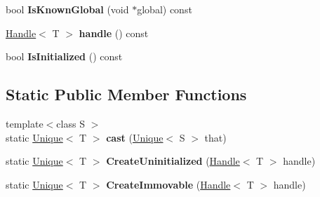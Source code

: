 \begin{DoxyCompactItemize}
\item 
\hypertarget{classv8_1_1internal_1_1_unique_ae68470ebf29b25950c9b5bfc5191d623}{}bool {\bfseries Is\+Known\+Global} (void $\ast$global) const \label{classv8_1_1internal_1_1_unique_ae68470ebf29b25950c9b5bfc5191d623}

\item 
\hypertarget{classv8_1_1internal_1_1_unique_afe001d104f7116f25ec7f745d98a6407}{}\hyperlink{classv8_1_1internal_1_1_handle}{Handle}$<$ T $>$ {\bfseries handle} () const \label{classv8_1_1internal_1_1_unique_afe001d104f7116f25ec7f745d98a6407}

\item 
\hypertarget{classv8_1_1internal_1_1_unique_ac09a1ae14715003aeeeab2c4d4ad7323}{}bool {\bfseries Is\+Initialized} () const \label{classv8_1_1internal_1_1_unique_ac09a1ae14715003aeeeab2c4d4ad7323}

\end{DoxyCompactItemize}
\subsection*{Static Public Member Functions}
\begin{DoxyCompactItemize}
\item 
\hypertarget{classv8_1_1internal_1_1_unique_a359d060b11f122d9df79f2a27a8db9cf}{}{\footnotesize template$<$class S $>$ }\\static \hyperlink{classv8_1_1internal_1_1_unique}{Unique}$<$ T $>$ {\bfseries cast} (\hyperlink{classv8_1_1internal_1_1_unique}{Unique}$<$ S $>$ that)\label{classv8_1_1internal_1_1_unique_a359d060b11f122d9df79f2a27a8db9cf}

\item 
\hypertarget{classv8_1_1internal_1_1_unique_acff014eaa7c4e0168feb2341cd1daf52}{}static \hyperlink{classv8_1_1internal_1_1_unique}{Unique}$<$ T $>$ {\bfseries Create\+Uninitialized} (\hyperlink{classv8_1_1internal_1_1_handle}{Handle}$<$ T $>$ handle)\label{classv8_1_1internal_1_1_unique_acff014eaa7c4e0168feb2341cd1daf52}

\item 
\hypertarget{classv8_1_1internal_1_1_unique_a721838c15b6958aabc7239717dae4119}{}static \hyperlink{classv8_1_1internal_1_1_unique}{Unique}$<$ T $>$ {\bfseries Create\+Immovable} (\hyperlink{classv8_1_1internal_1_1_handle}{Handle}$<$ T $>$ handle)\label{classv8_1_1internal_1_1_unique_a721838c15b6958aabc7239717dae4119}

\end{DoxyCompactItemize}
